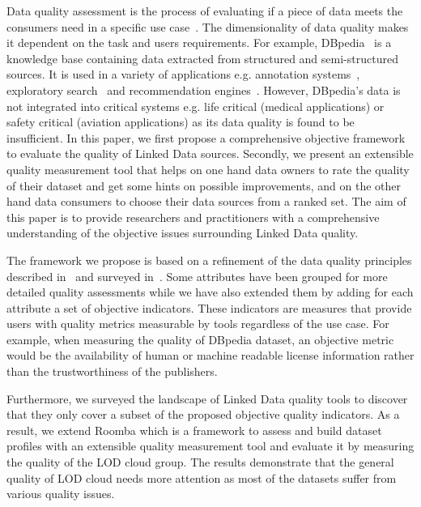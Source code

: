 Data quality assessment is the process of evaluating if a piece of data meets the consumers need in a specific use case~\cite{Bizer:WebSemantics:09}. The dimensionality of data quality makes it dependent on the task and users requirements. For example, DBpedia~\cite{Bizer:WebSemJorunal:09} is a knowledge base containing data extracted from structured and semi-structured sources. It is used in a variety of applications  e.g. annotation systems~\cite{Mendes:ICS:11}, exploratory search~\cite{Marie:ICS:13} and recommendation engines~\cite{DiNoia:iSemantics:12}. However, DBpedia's data is not integrated into critical systems e.g. life critical (medical applications) or safety critical (aviation applications) as its data quality is found to be insufficient. In this paper, we first propose a comprehensive objective framework to evaluate the quality of Linked Data sources. Secondly, we present an extensible quality measurement tool that helps on one hand data owners to rate the quality of their dataset and get some hints on possible improvements, and on the other hand data consumers to choose their data sources from a ranked set. The aim of this paper is to provide researchers and practitioners with a comprehensive understanding of the objective issues surrounding Linked Data quality.

The framework we propose is based on a refinement of the data quality principles described in~\cite{Assaf:DQMST:12} and surveyed in~\cite{Zaveri:SemWebJorunal:12}. Some attributes have been grouped for more detailed quality assessments while we have also extended them by adding for each attribute a set of objective indicators. These indicators are measures that provide users with quality metrics measurable by tools regardless of the use case. For example, when measuring the quality of DBpedia dataset, an objective metric would be the availability of human or machine readable license information rather than the trustworthiness of the publishers.

Furthermore, we surveyed the landscape of Linked Data quality tools to discover that they only cover a subset of the proposed objective quality indicators. As a result, we extend Roomba which is a framework to assess and build dataset profiles with an extensible quality measurement tool and evaluate it by measuring the quality of the LOD cloud group. The results demonstrate that the general quality of LOD cloud needs more attention as most of the datasets suffer from various quality issues.


